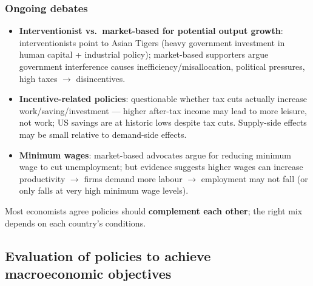 \documentclass[a4paper,12pt]{article}
\begin{document}
\subsubsection*{Ongoing debates}
\begin{itemize}
  \item \textbf{Interventionist vs.\ market-based for potential output growth}: interventionists point to Asian Tigers (heavy government investment in human capital + industrial policy); market-based supporters argue government interference causes inefficiency/misallocation, political pressures, high taxes $\to$ disincentives.
  \item \textbf{Incentive-related policies}: questionable whether tax cuts actually increase work/saving/investment --- higher after-tax income may lead to more leisure, not work; US savings are at historic lows despite tax cuts. Supply-side effects may be small relative to demand-side effects.
  \item \textbf{Minimum wages}: market-based advocates argue for reducing minimum wage to cut unemployment; but evidence suggests higher wages can increase productivity $\to$ firms demand more labour $\to$ employment may not fall (or only falls at very high minimum wage levels).
\end{itemize}
Most economists agree policies should \textbf{complement each other}; the right mix depends on each country's conditions.

\subsection{Evaluation of policies to achieve macroeconomic objectives}
\end{document}
